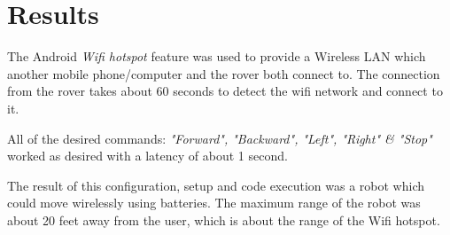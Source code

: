 \section{Results}

The Android \textit{Wifi hotspot} feature was used to provide a Wireless LAN which another mobile phone/computer and the rover both connect to. The connection from the rover takes about 60 seconds to detect the wifi network and connect to it.

All of the desired commands: \textit{"Forward", "Backward", "Left", "Right" \& "Stop"} worked as desired with a latency of about 1 second. 

The result of this configuration, setup and code execution was a robot which could move wirelessly using batteries. The maximum range of the robot was about 20 feet away from the user, which is about the range of the Wifi hotspot. 